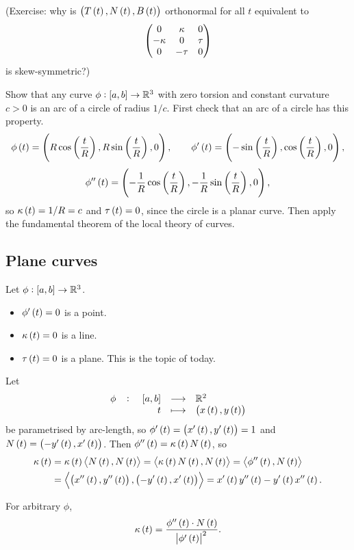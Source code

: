 (Exercise: why is $ \br{T\br{t}, N\br{t}, B\br{t}} $ orthonormal for all $ t $ equivalent to
$$ \begin{pmatrix} 0 & \kappa & 0 \\ -\kappa & 0 & \tau \\ 0 & -\tau & 0 \end{pmatrix} $$
is skew-symmetric?)


\begin{example*}
Show that any curve $ \phi : \sbr{a, b} \to \R^3 $ with zero torsion and constant curvature $ c > 0 $ is an arc of a circle of radius $ 1 / c $. First check that an arc of a circle has this property.
$$ \phi\br{t} = \br{R\cos\br{\dfrac{t}{R}}, R\sin\br{\dfrac{t}{R}}, 0}, \qquad \phi'\br{t} = \br{-\sin\br{\dfrac{t}{R}}, \cos\br{\dfrac{t}{R}}, 0}, $$
$$ \phi''\br{t} = \br{-\dfrac{1}{R}\cos\br{\dfrac{t}{R}}, -\dfrac{1}{R}\sin\br{\dfrac{t}{R}}, 0}, $$
so $ \kappa\br{t} = 1 / R = c $ and $ \tau\br{t} = 0 $, since the circle is a planar curve. Then apply the fundamental theorem of the local theory of curves.
\end{example*}

\pagebreak

\subsection{Plane curves}

Let $ \phi : \sbr{a, b} \to \R^3 $.
\begin{itemize}
\item $ \phi'\br{t} = 0 $ is a point.
\item $ \kappa\br{t} = 0 $ is a line.
\item $ \tau\br{t} = 0 $ is a plane. This is the topic of today.
\end{itemize}
Let
$$ \function[\phi]{\sbr{a, b}}{\R^2}{t}{\br{x\br{t}, y\br{t}}} $$
be parametrised by arc-length, so $ \phi'\br{t} = \br{x'\br{t}, y'\br{t}} = 1 $ and $ N\br{t} = \br{-y'\br{t}, x'\br{t}} $. Then $ \phi''\br{t} = \kappa\br{t}N\br{t} $, so
\begin{align*}
\kappa\br{t}
& = \kappa\br{t}\abr{N\br{t}, N\br{t}}
= \abr{\kappa\br{t}N\br{t}, N\br{t}}
= \abr{\phi''\br{t}, N\br{t}} \\
& = \abr{\br{x''\br{t}, y''\br{t}}, \br{-y'\br{t}, x'\br{t}}}
= x'\br{t}y''\br{t} - y'\br{t}x''\br{t}.
\end{align*}

\begin{proposition}
For arbitrary $ \phi $,
$$ \kappa\br{t} = \dfrac{\phi''\br{t} \cdot N\br{t}}{\abs{\phi'\br{t}}^2}. $$
\end{proposition}

